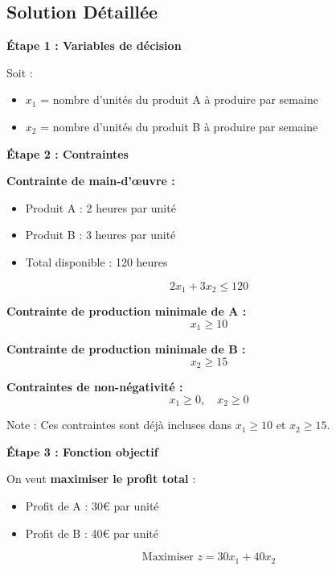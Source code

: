 \documentclass[12pt,a4paper]{article}
\begin{document}
\newpage
\subsection{Solution Détaillée}

\begin{solution}
\textbf{Étape 1 : Variables de décision}

Soit :
\begin{itemize}
    \item $x_1$ = nombre d'unités du produit A à produire par semaine
    \item $x_2$ = nombre d'unités du produit B à produire par semaine
\end{itemize}
\end{solution}

\begin{solution}
\textbf{Étape 2 : Contraintes}

\textcolor{titrebleu}{\textbf{Contrainte de main-d'œuvre :}}
\begin{itemize}
    \item Produit A : 2 heures par unité
    \item Produit B : 3 heures par unité
    \item Total disponible : 120 heures
\end{itemize}
$$2x_1 + 3x_2 \leq 120$$

\textcolor{defvert}{\textbf{Contrainte de production minimale de A :}}
$$x_1 \geq 10$$

\textcolor{algoviolet}{\textbf{Contrainte de production minimale de B :}}
$$x_2 \geq 15$$

\textcolor{exempleorange}{\textbf{Contraintes de non-négativité :}}
$$x_1 \geq 0, \quad x_2 \geq 0$$

Note : Ces contraintes sont déjà incluses dans $x_1 \geq 10$ et $x_2 \geq 15$.
\end{solution}

\begin{solution}
\textbf{Étape 3 : Fonction objectif}

On veut \textcolor{importantrouge}{\textbf{maximiser le profit total}} :
\begin{itemize}
    \item Profit de A : 30€ par unité
    \item Profit de B : 40€ par unité
\end{itemize}

$$\text{Maximiser } z = 30x_1 + 40x_2$$
\end{solution}
\end{document}
